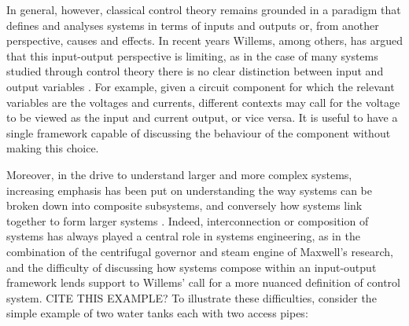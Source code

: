 In general, however, classical control theory remains grounded in a paradigm that defines and analyses systems in terms of inputs and outputs or, from another perspective, causes and effects. In recent years Willems, among others, has argued that this input-output perspective is limiting, as in the case of many systems studied through control theory there is no clear distinction between input and output variables \cite{Wi}. For example, given a circuit component for which the relevant variables are the voltages and currents, different contexts may call for the voltage to be viewed as the input and current output, or vice versa. It is useful to have a single framework capable of discussing the behaviour of the component without making this choice.

Moreover, in the drive to understand larger and more complex systems, increasing
emphasis has been put on understanding the way systems can be broken down into
composite subsystems, and conversely how systems link together to form larger
systems \cite{Wi2, KT}. Indeed, interconnection or composition of systems has
always played a central role in systems engineering, as in the combination of
the centrifugal governor and steam engine of Maxwell's research, and the
difficulty of discussing how systems compose within an input-output framework
lends support to Willems' call for a more nuanced definition of control system.
CITE THIS EXAMPLE? To illustrate these difficulties, consider the simple example of two water tanks each with two access pipes:
